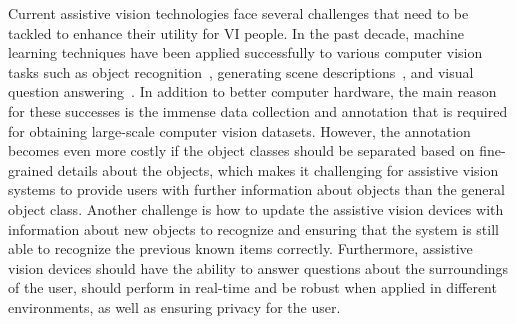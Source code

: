 Current assistive vision technologies face several challenges that need to be tackled to enhance their utility for VI people. In the past decade, machine learning techniques have been applied successfully to various computer vision tasks such as object recognition~\cite{krizhevsky2012imagenet, he2016deep, dosovitskiy2020image}, generating scene descriptions~\cite{xu2015show, johnson2016densecap, anderson2018bottom}, and visual question answering~\cite{antol2015vqa, hudson2019gqa, hu2019language}. In addition to better computer hardware, the main reason for these successes is the immense data collection and annotation that is required for obtaining large-scale computer vision datasets. However, the annotation becomes even more costly if the object classes should be separated based on fine-grained details about the objects, which makes it challenging for assistive vision systems to provide users with further information about objects than the general object class. Another challenge is how to update the assistive vision devices with information about new objects to recognize and ensuring that the system is still able to recognize the previous known items correctly. Furthermore, assistive vision devices should have the ability to answer questions about the surroundings of the user, should perform in real-time and be robust when applied in different environments, as well as ensuring privacy for the user.





